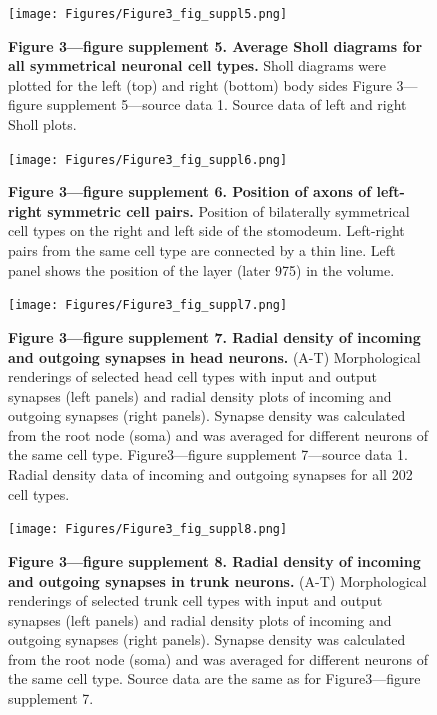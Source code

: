\documentclass[
  11pt,
]{article}
\begin{document}
\begin{figure}[H]

{\centering \texttt{[image: Figures/Figure3\_fig\_suppl5.png]}

}

\caption{\textbf{Figure 3---figure supplement 5. Average Sholl diagrams
for all symmetrical neuronal cell types.} Sholl diagrams were plotted
for the left (top) and right (bottom) body sides Figure 3---figure
supplement 5---source data 1. Source data of left and right Sholl
plots.}

\end{figure}%

\begin{figure}[H]

{\centering \texttt{[image: Figures/Figure3\_fig\_suppl6.png]}

}

\caption{\textbf{Figure 3---figure supplement 6. Position of axons of
left-right symmetric cell pairs. } Position of bilaterally symmetrical
cell types on the right and left side of the stomodeum. Left-right pairs
from the same cell type are connected by a thin line. Left panel shows
the position of the layer (later 975) in the volume.}

\end{figure}%

\begin{figure}[H]

{\centering \texttt{[image: Figures/Figure3\_fig\_suppl7.png]}

}

\caption{\textbf{Figure 3---figure supplement 7. Radial density of
incoming and outgoing synapses in head neurons. } (A-T) Morphological
renderings of selected head cell types with input and output synapses
(left panels) and radial density plots of incoming and outgoing synapses
(right panels). Synapse density was calculated from the root node (soma)
and was averaged for different neurons of the same cell type.
Figure3---figure supplement 7---source data 1. Radial density data of
incoming and outgoing synapses for all 202 cell types.}

\end{figure}%

\begin{figure}[H]

{\centering \texttt{[image: Figures/Figure3\_fig\_suppl8.png]}

}

\caption{\textbf{Figure 3---figure supplement 8. Radial density of
incoming and outgoing synapses in trunk neurons. } (A-T) Morphological
renderings of selected trunk cell types with input and output synapses
(left panels) and radial density plots of incoming and outgoing synapses
(right panels). Synapse density was calculated from the root node (soma)
and was averaged for different neurons of the same cell type. Source
data are the same as for Figure3---figure supplement 7.}

\end{figure}%
\end{document}
